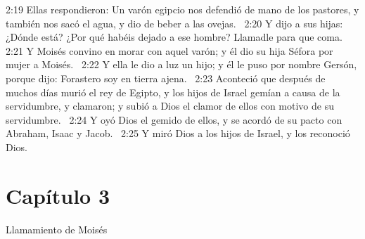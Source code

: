 2:19 Ellas respondieron: Un varón egipcio nos defendió de mano de los pastores, y también nos sacó el agua, y dio de beber a las ovejas.  
2:20 Y dijo a sus hijas: ¿Dónde está? ¿Por qué habéis dejado a ese hombre? Llamadle para que coma.  
2:21 Y Moisés convino en morar con aquel varón; y él dio su hija Séfora por mujer a Moisés.  
2:22 Y ella le dio a luz un hijo; y él le puso por nombre Gersón, porque dijo: Forastero soy en tierra ajena.  
2:23 Aconteció que después de muchos días murió el rey de Egipto, y los hijos de Israel gemían a causa de la servidumbre, y clamaron; y subió a Dios el clamor de ellos con motivo de su servidumbre.  
2:24 Y oyó Dios el gemido de ellos, y se acordó de su pacto con Abraham, Isaac y Jacob.  
2:25 Y miró Dios a los hijos de Israel, y los reconoció Dios.  
\section*{Capítulo 3}
Llamamiento de Moisés 

